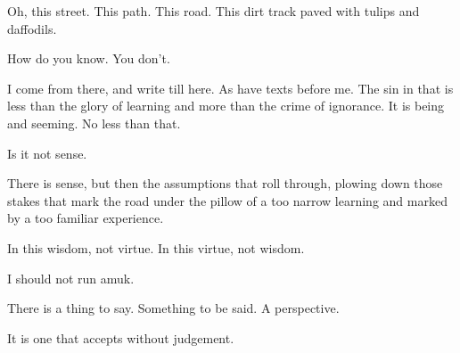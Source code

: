 

﻿Oh, this street.  This path.  This road.  This dirt track paved with tulips and daffodils. 


How do you know.  You don’t. 


I come from there, and write till here.  As have texts before me.  The sin in that is less than the glory of learning and more than the crime of ignorance.  It is being and seeming.  No less than that.


Is it not sense.  


There is sense, but then the assumptions that roll through, plowing down those stakes that mark the road under the pillow of a too narrow learning and marked by a too familiar experience.


In this wisdom, not virtue.  In this virtue, not wisdom.


I should not run amuk.


There is a thing to say.  Something to be said.  A perspective.


It is one that accepts without judgement.
\bye
